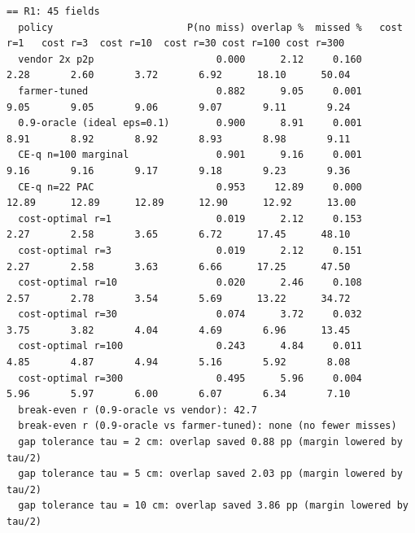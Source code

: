 \documentclass[preprint,12pt,authoryear]{elsarticle}
\begin{document}
\begin{Verbatim}[fontsize=\tiny,breaklines]
== R1: 45 fields
  policy                       P(no miss) overlap %  missed %   cost r=1   cost r=3  cost r=10  cost r=30 cost r=100 cost r=300
  vendor 2x p2p                     0.000      2.12     0.160       2.28       2.60       3.72       6.92      18.10      50.04
  farmer-tuned                      0.882      9.05     0.001       9.05       9.05       9.06       9.07       9.11       9.24
  0.9-oracle (ideal eps=0.1)        0.900      8.91     0.001       8.91       8.92       8.92       8.93       8.98       9.11
  CE-q n=100 marginal               0.901      9.16     0.001       9.16       9.16       9.17       9.18       9.23       9.36
  CE-q n=22 PAC                     0.953     12.89     0.000      12.89      12.89      12.89      12.90      12.92      13.00
  cost-optimal r=1                  0.019      2.12     0.153       2.27       2.58       3.65       6.72      17.45      48.10
  cost-optimal r=3                  0.019      2.12     0.151       2.27       2.58       3.63       6.66      17.25      47.50
  cost-optimal r=10                 0.020      2.46     0.108       2.57       2.78       3.54       5.69      13.22      34.72
  cost-optimal r=30                 0.074      3.72     0.032       3.75       3.82       4.04       4.69       6.96      13.45
  cost-optimal r=100                0.243      4.84     0.011       4.85       4.87       4.94       5.16       5.92       8.08
  cost-optimal r=300                0.495      5.96     0.004       5.96       5.97       6.00       6.07       6.34       7.10
  break-even r (0.9-oracle vs vendor): 42.7
  break-even r (0.9-oracle vs farmer-tuned): none (no fewer misses)
  gap tolerance tau = 2 cm: overlap saved 0.88 pp (margin lowered by tau/2)
  gap tolerance tau = 5 cm: overlap saved 2.03 pp (margin lowered by tau/2)
  gap tolerance tau = 10 cm: overlap saved 3.86 pp (margin lowered by tau/2)


\end{Verbatim}
\end{document}
